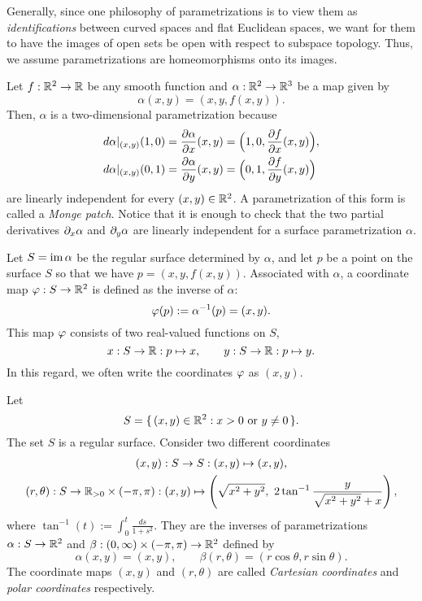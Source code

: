 \documentclass{../exp}
\def\a{\alpha}
\begin{document}
\begin{exs}
Generally, since one philosophy of parametrizations is to view them as \emph{identifications} between curved spaces and flat Euclidean spaces, we want for them to have the images of open sets be open with respect to subspace topology.
Thus, we assume parametrizations are homeomorphisms onto its images.

\item
Let $f:\R^2\to\R$ be any smooth function and $\a:\R^2\to\R^3$ be a map given by
\[\a(x,y)=(x,y,f(x,y)).\]
Then, $\a$ is a two-dimensional parametrization because
\begin{align*}
d\a|_{(x,y)}(1,0)&=\pd{\a}{x}(x,y)=\Bigl(1,0,\pd{f}{x}(x,y)\Bigr),\\
d\a|_{(x,y)}(0,1)&=\pd{\a}{y}(x,y)=\Bigl(0,1,\pd{f}{y}(x,y)\Bigr)
\end{align*}
are linearly independent for every $(x,y)\in\mathbb{R}^2$.
A parametrization of this form is called a \emph{Monge patch}.
Notice that it is enough to check that the two partial derivatives $\pd_x\a$ and $\pd_y\a$ are linearly independent for a surface parametrization $\a$.

Let $S=\im\a$ be the regular surface determined by $\a$, and let $p$ be a point on the surface $S$ so that we have $p=(x,y,f(x,y))$.
Associated with $\a$, a coordinate map $\f:S\to\R^2$ is defined as the inverse of $\a$:
\[\f(p):=\a^{-1}(p)=(x,y).\]
This map $\varphi$ consists of two real-valued functions on $S$,
\[x:S\to\R:p\mapsto x,\qquad y:S\to\R:p\mapsto y.\]
In this regard, we often write the coordinates $\varphi$ as $(x,y)$.

\item
Let
\[S=\{\,(x,y)\in\mathbb{R}^2:x>0\text{ or }y\ne0\,\}.\]
The set $S$ is a regular surface.
Consider two different coordinates
\begin{gather*}
(x,y):S\to S:(x,y)\mapsto(x,y),\\
(r,\theta):S\to\R_{>0}\times(-\pi,\pi):(x,y)\mapsto\left(\sqrt{x^2+y^2},\ 2\tan^{-1}\frac y{\sqrt{x^2+y^2}+x}\right),
\end{gather*}
where $\tan^{-1}(t):=\int_0^t\frac{ds}{1+s^2}$.
They are the inverses of parametrizations $\a:S\to\R^2$ and $\beta:(0,\infty)\times(-\pi,\pi)\to\R^2$ defined by
\[\a(x,y)=(x,y),\qquad\beta(r,\theta)=(r\cos\theta,r\sin\theta).\]
The coordinate maps $(x,y)$ and $(r,\theta)$ are called \emph{Cartesian coordinates} and \emph{polar coordinates} respectively.
\end{exs}
\end{document}
